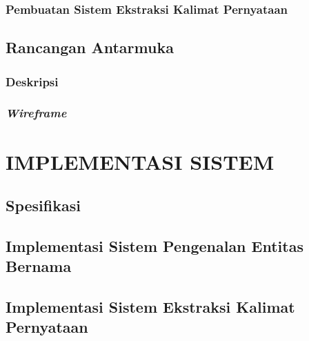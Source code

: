 \documentclass[ugmskripsi]{ugmskripsi}
\begin{document}
		\subsection{Pembuatan Sistem Ekstraksi Kalimat Pernyataan}
		\label{rancangan sistem ekstraksi kalimat pernyataan}
		

	\section{Rancangan Antarmuka}
	\label{rancangan antarmuka}

		\subsection{Deskripsi}
		\label{rancangan deskripsi antarmuka}
		

		\subsection{\textit{Wireframe}}
	    \label{rancangan wireframe antarmuka}
	    



\chapter{IMPLEMENTASI SISTEM}
\label{IMPLEMENTASI SISTEM}

	\section{Spesifikasi}
	\label{implementasi spesifikasi}
	

	\section{Implementasi Sistem Pengenalan Entitas Bernama}
	\label{implementasi sistem ner}
	

	\section{Implementasi Sistem Ekstraksi Kalimat Pernyataan}
	\label{implementasi sistem ekstraksi kalimat pernyataan}
	
\end{document}
